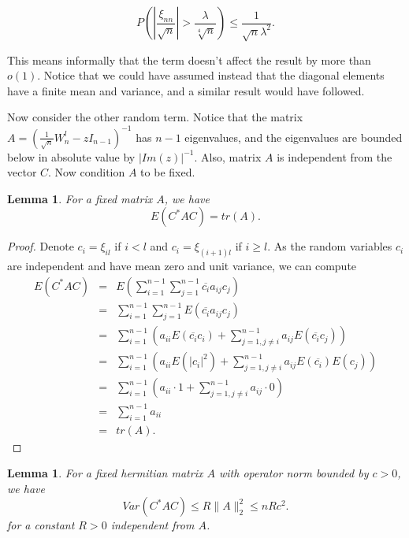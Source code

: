 \documentclass[12pt,a4paper,leqno]{report}
\theoremstyle{plain}
\newtheorem{lem}[equation]{Lemma}
\theoremstyle{definition}
\theoremstyle{remark}
\begin{document}
\begin{equation*}
P(|\frac{\xi_{nn}}{\sqrt{n}}|>\frac{\lambda}{\sqrt[4]{n}}) \leq \frac{1}{\sqrt{n}\lambda^2}. 
\end{equation*}

This means informally that the term doesn't affect the result by more than $o(1)$. Notice that we could have assumed instead that the diagonal elements have a finite mean and variance, and a similar result would have followed.

Now consider the other random term. Notice that the matrix $A = (\frac{1}{\sqrt{n}}W_n^l-zI_{n-1})^{-1}$ has $n-1$ eigenvalues, and the eigenvalues are bounded below in absolute value by $|Im(z)|^{-1}$. Also, matrix $A$ is independent from the vector $C$. Now condition $A$ to be fixed.

\begin{lem}
For a fixed matrix $A$, we have
\begin{equation*}
E(C^* A C) = tr(A).
\end{equation*}
\end{lem}

\begin{proof}
Denote $c_i = \xi_{il}$ if $i<l$ and $c_i = \xi_{(i+1)l}$ if $i\geq l$.
As the random variables $c_i$ are independent and have mean zero and unit variance, we can compute
\begin{eqnarray*}
E(C^* A C) & = & E(\sum_{i=1}^{n-1} \sum_{j=1}^{n-1} \overline{c_i} a_{ij} c_j)\\
& = & \sum_{i=1}^{n-1} \sum_{j=1}^{n-1} E(\overline{c_i} a_{ij} c_j)\\
& = & \sum_{i=1}^{n-1} (a_{ii} E(\overline{c_i}c_i) + \sum_{j=1,j \neq i}^{n-1} a_{ij} E(\overline{c_i} c_j))\\
& = & \sum_{i=1}^{n-1} (a_{ii} E(|c_i|^2 ) + \sum_{j=1,j \neq i}^{n-1} a_{ij} E(\overline{c_i}) E(c_j))\\
& = & \sum_{i=1}^{n-1} (a_{ii} \cdot 1 + \sum_{j=1,j \neq i}^{n-1} a_{ij} \cdot 0)\\
& = & \sum_{i=1}^{n-1} a_{ii}\\
& = & tr(A).
\end{eqnarray*} 
\end{proof}

\begin{lem}
For a fixed hermitian matrix $A$ with operator norm bounded by $c>0$, we have
\begin{equation*}
Var(C^* A C) \leq R \| A \|_2^2 \leq n R c^2.
\end{equation*}
for a constant $R>0$ independent from $A$.
\end{lem}
\end{document}
